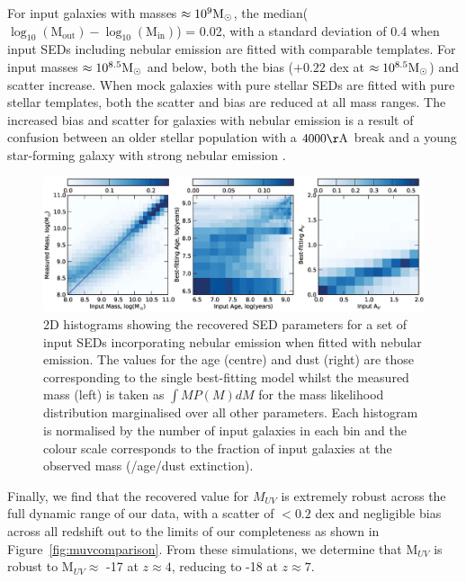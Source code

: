For input galaxies with masses $\approx 10^9 \rm{M}_{\odot}$, the median($\log_{10}(\text{M}_{\text{out}}) - \log_{10}(\text{M}_{\text{in}})$) = 0.02, with a standard deviation of 0.4 when input SEDs including nebular emission are fitted with comparable templates. For input masses $\approx 10^{8.5} \rm{M}_{\odot}$ and below, both the bias ($+0.22$ dex at $\approx 10^{8.5} \rm{M}_{\odot}$) and scatter increase.
When mock galaxies with pure stellar SEDs are fitted with pure stellar templates, both the scatter and bias are reduced at all mass ranges. The increased bias and scatter for galaxies with nebular emission is a result of confusion between an older stellar population with a $4000\rm{\AA}$ break and a young star-forming galaxy with strong nebular emission \citep{2009A&A...502..423S,2013MNRAS.429..302C}. 

\begin{figure}
\includegraphics[width=\textwidth]{plots/fig5.eps}
\caption{2D histograms showing the recovered SED parameters for a set of input SEDs incorporating nebular emission when fitted with nebular emission. The values for the age (centre) and dust (right) are those corresponding to the single best-fitting model whilst the measured mass (left) is taken as $\int M P(M)dM$ for the mass likelihood distribution  marginalised over all other parameters. Each histogram is normalised by the number of input galaxies in each bin and the colour scale corresponds to the fraction of input galaxies at the observed mass (/age/dust extinction).}
\label{fig:masscomparison}
\end{figure}

Finally, we find that the recovered value for $M_{UV}$ is extremely robust across the full dynamic range of our data, with a scatter of $< 0.2$ dex and negligible bias across all redshift out to the limits of our completeness as shown in Figure~\ref{fig:muvcomparison}. From these simulations, we determine that M$_{UV}$ is robust to M$_{UV} \approx$ -17 at $z \approx 4$, reducing to -18 at $z \approx 7$.

